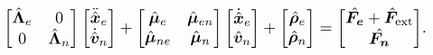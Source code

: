 \documentclass[../main.tex]{subfiles}
\begin{document}
\begin{equation}
\label{eq:dyn_decop_vms}
\resizebox{1\hsize}{!}{
    $\begin{bmatrix}
        \hat{\bm{\Lambda}}_e & 0 \\
        0 & \hat{\bm{\Lambda}}_n
    \end{bmatrix}\begin{bmatrix}
        \ddot{\hat{\bm{x}}}_e \\
        \dot{\hat{\bm{v}}}_n
    \end{bmatrix} +
    \begin{bmatrix}
        \hat{\bm{\mu}}_e & \hat{\bm{\mu}}_{en} \\
        \hat{\bm{\mu}}_{ne} & \hat{\bm{\mu}}_{n}
    \end{bmatrix}\begin{bmatrix}
        \dot{\hat{\bm{x}}}_e \\
        \hat{\bm{v}}_n
    \end{bmatrix} + \begin{bmatrix}
        \hat{\bm{\rho}}_e \\
        \hat{\bm{\rho}}_n
    \end{bmatrix}= \begin{bmatrix}
        \hat{\bm{F_e}} + \hat{\bm{F}}_{\rm ext}\\
        \hat{\bm{F_n}}
    \end{bmatrix}$.
}
\end{equation} \par
\end{document}
